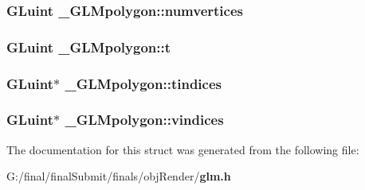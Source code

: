 \subsubsection[{numvertices}]{\setlength{\rightskip}{0pt plus 5cm}G\-Luint \-\_\-\-G\-L\-Mpolygon\-::numvertices}\label{struct___g_l_mpolygon_a3212480f246df053e6618f92e5784c28}
\subsubsection[{t}]{\setlength{\rightskip}{0pt plus 5cm}G\-Luint \-\_\-\-G\-L\-Mpolygon\-::t}\label{struct___g_l_mpolygon_a878a8a32aefb18b89a6d3558c4fbb6ce}
\subsubsection[{tindices}]{\setlength{\rightskip}{0pt plus 5cm}G\-Luint$\ast$ \-\_\-\-G\-L\-Mpolygon\-::tindices}\label{struct___g_l_mpolygon_aa9f687924cfdea4de44b4a2cd83c351e}
\subsubsection[{vindices}]{\setlength{\rightskip}{0pt plus 5cm}G\-Luint$\ast$ \-\_\-\-G\-L\-Mpolygon\-::vindices}\label{struct___g_l_mpolygon_afdc176a2c0009573e86dbb71bed6037b}


The documentation for this struct was generated from the following file\-:\begin{DoxyCompactItemize}
\item 
G\-:/final/final\-Submit/finals/obj\-Render/{\bf glm.\-h}\end{DoxyCompactItemize}
